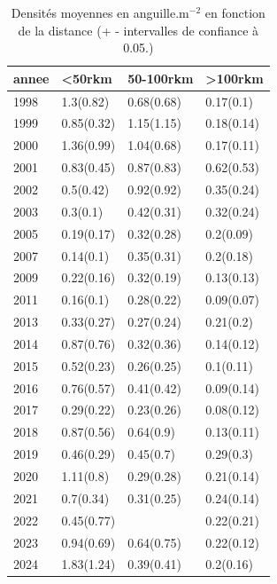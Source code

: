 \begin{table}[htbp]
\centering
\caption[Densité et distance.]{Densités moyennes en anguille.m$^{-2}$ en fonction de la distance (+ - intervalles de confiance à 0.05.)} 
\label{tableau3_dens_dist_annee}
\begin{tabular}{llll}
  \hline
annee & <50rkm & 50-100rkm & >100rkm \\ 
  \hline
1998 & 1.3(0.82) & 0.68(0.68) & 0.17(0.1) \\ 
  1999 & 0.85(0.32) & 1.15(1.15) & 0.18(0.14) \\ 
  2000 & 1.36(0.99) & 1.04(0.68) & 0.17(0.11) \\ 
  2001 & 0.83(0.45) & 0.87(0.83) & 0.62(0.53) \\ 
  2002 & 0.5(0.42) & 0.92(0.92) & 0.35(0.24) \\ 
  2003 & 0.3(0.1) & 0.42(0.31) & 0.32(0.24) \\ 
  2005 & 0.19(0.17) & 0.32(0.28) & 0.2(0.09) \\ 
  2007 & 0.14(0.1) & 0.35(0.31) & 0.2(0.18) \\ 
  2009 & 0.22(0.16) & 0.32(0.19) & 0.13(0.13) \\ 
  2011 & 0.16(0.1) & 0.28(0.22) & 0.09(0.07) \\ 
  2013 & 0.33(0.27) & 0.27(0.24) & 0.21(0.2) \\ 
  2014 & 0.87(0.76) & 0.32(0.36) & 0.14(0.12) \\ 
  2015 & 0.52(0.23) & 0.26(0.25) & 0.1(0.11) \\ 
  2016 & 0.76(0.57) & 0.41(0.42) & 0.09(0.14) \\ 
  2017 & 0.29(0.22) & 0.23(0.26) & 0.08(0.12) \\ 
  2018 & 0.87(0.56) & 0.64(0.9) & 0.13(0.11) \\ 
  2019 & 0.46(0.29) & 0.45(0.7) & 0.29(0.3) \\ 
  2020 & 1.11(0.8) & 0.29(0.28) & 0.21(0.14) \\ 
  2021 & 0.7(0.34) & 0.31(0.25) & 0.24(0.14) \\ 
  2022 & 0.45(0.77) &  & 0.22(0.21) \\ 
  2023 & 0.94(0.69) & 0.64(0.75) & 0.22(0.12) \\ 
  2024 & 1.83(1.24) & 0.39(0.41) & 0.2(0.16) \\ 
   \hline
\end{tabular}
\end{table}
